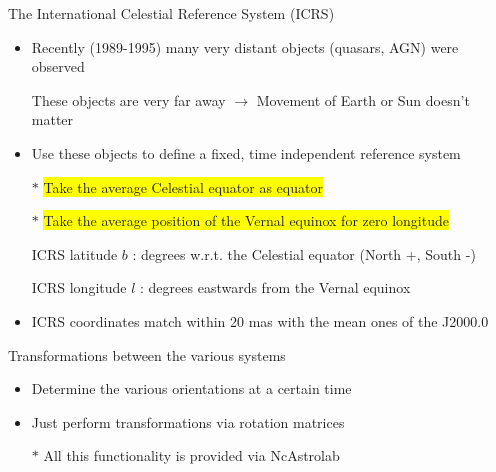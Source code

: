 \Tr
\onecolumn
\begin{center}
{\red The International Celestial Reference System (ICRS)}
\end{center}
%
\begin{itemize}
\item Recently (1989-1995) many very distant objects (quasars, AGN) were observed
\item[] These objects are very far away $\rightarrow$ Movement of Earth or Sun doesn't matter
\item Use these objects to define a fixed, time independent reference system
\item[$\ast$] \colorbox{yellow}{Take the average Celestial equator as equator}
\item[$\ast$] \colorbox{yellow}{Take the average position of the Vernal equinox for zero longitude}
\item[] {\blue ICRS latitude $b$} : degrees w.r.t. the Celestial equator (North +, South -)
\item[] {\blue ICRS longitude $l$} : degrees eastwards from the Vernal equinox
\item ICRS coordinates match within 20 mas with the mean ones of the J2000.0
\end{itemize}
%
\begin{center}
{\red Transformations between the various systems}
\end{center}
%
\begin{itemize}
\item Determine the various orientations at a certain time
\item Just perform transformations via rotation matrices
\item[$\ast$] {\blue All this functionality is provided via NcAstrolab}
\end{itemize}